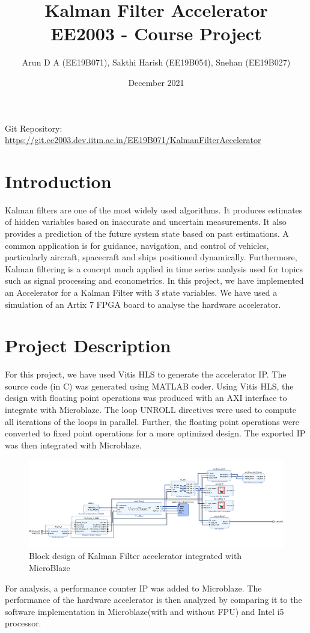 \documentclass[11pt, a4paper]{article}
\title{\vspace{-2cm}%
  Kalman Filter Accelerator \\
  \vspace{0.5cm} \large EE2003 - Course Project}
\author{Arun D A (EE19B071), Sakthi Harish (EE19B054), Snehan (EE19B027)}
\date{December 2021}
\begin{document}
\maketitle

Git Repository: \url{https://git.ee2003.dev.iitm.ac.in/EE19B071/KalmanFilterAccelerator}
\section{Introduction}
Kalman filters are one of the most widely used algorithms. It produces estimates of hidden variables based on inaccurate and uncertain measurements. It also provides a prediction of the future system state based on past estimations. A common application is for guidance, navigation, and control of vehicles, particularly aircraft, spacecraft and ships positioned dynamically. Furthermore, Kalman filtering is a concept much applied in time series analysis used for topics such as signal processing and econometrics.
\newline
\newline In this project, we have implemented an Accelerator for a  Kalman Filter with 3 state variables. We have used a simulation of an Artix 7 FPGA board to analyse the hardware accelerator.  
\section{Project Description}
For this project, we have used Vitis HLS to generate the accelerator IP. The source code (in C) was generated using MATLAB coder. Using Vitis HLS, the design with floating point operations was produced with an AXI interface to integrate with Microblaze. The loop UNROLL directives were used to compute all iterations of the loops in parallel. Further, the floating point operations were converted to fixed point operations for a more optimized design. The exported IP was then integrated with Microblaze. 
\vspace{0.5cm}

\begin{figure}[!tbh]
\centering
\includegraphics[scale=0.56]{bloc_design.png} 
\caption{Block design of Kalman Filter accelerator integrated with MicroBlaze}
\label{fig:fig_1}
\end{figure}
\vspace{0.5cm}
 For analysis, a performance counter IP was added to Microblaze. The performance of the hardware accelerator is then analyzed by comparing it to the software implementation in Microblaze(with and without FPU) and Intel i5 processor.
\newpage
\end{document}
